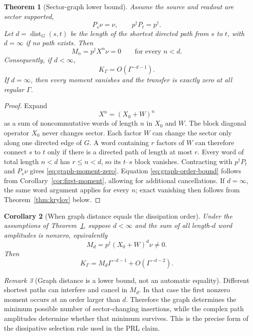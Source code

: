 \documentclass[11pt,a4paper]{article}
\newtheorem{theorem}{Theorem}[section]
\newtheorem{corollary}[theorem]{Corollary}
\theoremstyle{remark}
\newtheorem{remark}[theorem]{Remark}
\newcommand{\dist}{\operatorname{dist}}
\begin{document}
\begin{theorem}[Sector-graph lower bound]
\label{thm:sector-graph}
Assume the source and readout are sector supported,
\[
P_s\nu=\nu,
\qquad
p^\dagger P_t=p^\dagger.
\]
Let $d=\dist_G(s,t)$ be the length of the shortest directed path from $s$ to
$t$, with $d=\infty$ if no path exists.  Then
\begin{equation}
M_n=p^\dagger X^n\nu=0
\qquad\text{for every }n<d.
\label{eq:graph-moment-zero}
\end{equation}
Consequently, if $d<\infty$,
\begin{equation}
K_\Gamma=O(\Gamma^{-d-1}).
\label{eq:graph-order-bound}
\end{equation}
If $d=\infty$, then every moment vanishes and the transfer is exactly zero at
all regular $\Gamma$.
\end{theorem}

\begin{proof}
Expand
\[
X^n=(X_0+W)^n
\]
as a sum of noncommutative words of length $n$ in $X_0$ and $W$.  The block
diagonal operator $X_0$ never changes sector.  Each factor $W$ can change the
sector only along one directed edge of $G$.  A word containing $r$ factors of
$W$ can therefore connect $s$ to $t$ only if there is a directed path of
length at most $r$.  Every word of total length $n<d$ has $r\le n<d$, so its
$t$--$s$ block vanishes.  Contracting with $p^\dagger P_t$ and $P_s\nu$
gives \eqref{eq:graph-moment-zero}.  Equation
\eqref{eq:graph-order-bound} follows from
Corollary~\ref{cor:first-moment}, allowing for additional cancellations.  If
$d=\infty$, the same word argument applies for every $n$; exact vanishing then
follows from Theorem~\ref{thm:krylov} below.
\end{proof}

\begin{corollary}[When graph distance equals the dissipation order]
\label{cor:graph-equality}
Under the assumptions of Theorem~\ref{thm:sector-graph}, suppose $d<\infty$
and the sum of all length-$d$ word amplitudes is nonzero, equivalently
\begin{equation}
M_d=p^\dagger(X_0+W)^d\nu\ne0.
\label{eq:Md-nonzero}
\end{equation}
Then
\begin{equation}
K_\Gamma=M_d\Gamma^{-d-1}+O(\Gamma^{-d-2}).
\end{equation}
\end{corollary}

\begin{remark}[Graph distance is a lower bound, not an automatic equality]
Different shortest paths can interfere and cancel in $M_d$.  In that case the
first nonzero moment occurs at an order larger than $d$.  Therefore the graph
determines the minimum possible number of sector-changing insertions, while
the complex path amplitudes determine whether that minimum survives.  This is
the precise form of the dissipative selection rule used in the PRL claim.
\end{remark}
\end{document}
